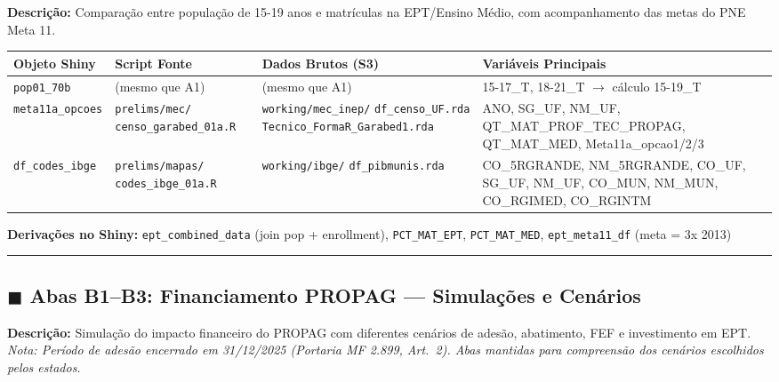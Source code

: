 \documentclass[10pt]{article}
\begin{document}
	\noindent\textbf{Descrição:} Comparação entre população de 15-19 anos e matrículas na EPT/Ensino Médio, com acompanhamento das metas do PNE Meta 11.
	
	\begin{center}
		\small
		\begin{tabular}{p{3.5cm}p{4.5cm}p{5cm}p{9cm}}
			\toprule
			\textbf{Objeto Shiny} & \textbf{Script Fonte} & \textbf{Dados Brutos (S3)} & \textbf{Variáveis Principais} \\
			\midrule
			\texttt{pop01\_70b} & (mesmo que A1) & (mesmo que A1) & 15-17\_T, 18-21\_T $\rightarrow$ cálculo 15-19\_T \\
			\texttt{meta11a\_opcoes} & \texttt{prelims/mec/} \newline \texttt{censo\_garabed\_01a.R} & \texttt{working/mec\_inep/} \newline \texttt{df\_censo\_UF.rda} \newline \texttt{Tecnico\_FormaR\_Garabed1.rda} & ANO, SG\_UF, NM\_UF, QT\_MAT\_PROF\_TEC\_PROPAG, QT\_MAT\_MED, Meta11a\_opcao1/2/3 \\
			\texttt{df\_codes\_ibge} & \texttt{prelims/mapas/} \newline \texttt{codes\_ibge\_01a.R} & \texttt{working/ibge/} \newline \texttt{df\_pibmunis.rda} & CO\_5RGRANDE, NM\_5RGRANDE, CO\_UF, SG\_UF, NM\_UF, CO\_MUN, NM\_MUN, CO\_RGIMED, CO\_RGINTM \\
			\bottomrule
		\end{tabular}
	\end{center}
	
	\noindent\textbf{Derivações no Shiny:} \texttt{ept\_combined\_data} (join pop + enrollment), \texttt{PCT\_MAT\_EPT}, \texttt{PCT\_MAT\_MED}, \texttt{ept\_meta11\_df} (meta = 3x 2013)
	
	\vspace{0.8em}
	\hrule
	\vspace{0.8em}
	
	\subsection*{\textcolor{tabB}{$\blacksquare$} Abas B1--B3: Financiamento PROPAG --- Simulações e Cenários}
	
	\noindent\textbf{Descrição:} Simulação do impacto financeiro do PROPAG com diferentes cenários de adesão, abatimento, FEF e investimento em EPT. \textit{Nota: Período de adesão encerrado em 31/12/2025 (Portaria MF 2.899, Art.\ 2). Abas mantidas para compreensão dos cenários escolhidos pelos estados.}
	
\end{document}
